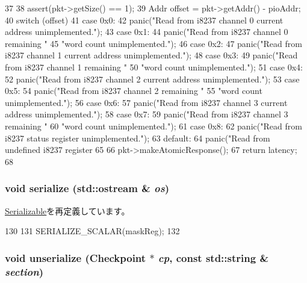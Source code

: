 \begin{DoxyCode}
37 {
38     assert(pkt->getSize() == 1);
39     Addr offset = pkt->getAddr() - pioAddr;
40     switch (offset) {
41       case 0x0:
42         panic("Read from i8237 channel 0 current address unimplemented.\n");
43       case 0x1:
44         panic("Read from i8237 channel 0 remaining "
45                 "word count unimplemented.\n");
46       case 0x2:
47         panic("Read from i8237 channel 1 current address unimplemented.\n");
48       case 0x3:
49         panic("Read from i8237 channel 1 remaining "
50                 "word count unimplemented.\n");
51       case 0x4:
52         panic("Read from i8237 channel 2 current address unimplemented.\n");
53       case 0x5:
54         panic("Read from i8237 channel 2 remaining "
55                 "word count unimplemented.\n");
56       case 0x6:
57         panic("Read from i8237 channel 3 current address unimplemented.\n");
58       case 0x7:
59         panic("Read from i8237 channel 3 remaining "
60                 "word count unimplemented.\n");
61       case 0x8:
62         panic("Read from i8237 status register unimplemented.\n");
63       default:
64         panic("Read from undefined i8237 register %
65     }
66     pkt->makeAtomicResponse();
67     return latency;
68 }
\end{DoxyCode}
\hypertarget{classX86ISA_1_1I8237_a53e036786d17361be4c7320d39c99b84}{
\subsubsection[{serialize}]{\setlength{\rightskip}{0pt plus 5cm}void serialize (std::ostream \& {\em os})}}
\label{classX86ISA_1_1I8237_a53e036786d17361be4c7320d39c99b84}


\hyperlink{classSerializable_ad6272f80ae37e8331e3969b3f072a801}{Serializable}を再定義しています。


\begin{DoxyCode}
130 {
131     SERIALIZE_SCALAR(maskReg);
132 }
\end{DoxyCode}
\hypertarget{classX86ISA_1_1I8237_af22e5d6d660b97db37003ac61ac4ee49}{
\subsubsection[{unserialize}]{\setlength{\rightskip}{0pt plus 5cm}void unserialize ({\bf Checkpoint} $\ast$ {\em cp}, \/  const std::string \& {\em section})}}
\label{classX86ISA_1_1I8237_af22e5d6d660b97db37003ac61ac4ee49}


